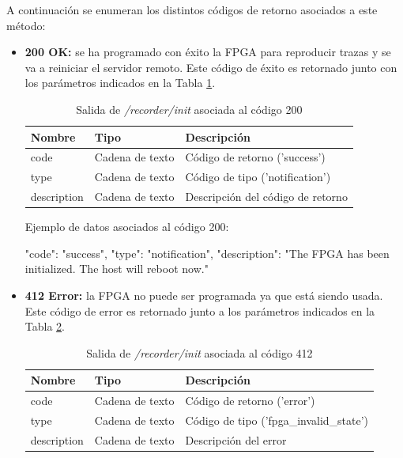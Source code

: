 A continuación se enumeran los distintos códigos de retorno asociados a este método:
\begin{itemize}

\item{\textbf{200 OK:} se ha programado con éxito la \gls{FPGA} para reproducir \glspl{traza} y se va a reiniciar el servidor remoto. Este código de éxito es retornado junto con los parámetros indicados en la Tabla \ref{extra:api:recorderinit:ok}.
\begin{table}[H]
\centering
\begin{tabular}{|l|l|l|}
\hline
\rowcolor[HTML]{F5F5F5}
\textbf{Nombre}  & \textbf{Tipo}   & \textbf{Descripción}              \\ \hline
code             & Cadena de texto & Código de retorno ('success')     \\ \hline
type             & Cadena de texto & Código de tipo ('notification')   \\ \hline
description      & Cadena de texto & Descripción del código de retorno \\ \hline
\end{tabular}
\caption{Salida de \textit{/recorder/init} asociada al código 200}
\label{extra:api:recorderinit:ok}
\end{table}
\begin{minipage}{\textwidth}
Ejemplo de datos asociados al código 200:

\begin{code}[language=json]
{
  "code": "success",
  "type": "notification",
  "description": "The FPGA has been initialized. The host will reboot now."
}
\end{code}
\end{minipage}
}

\item{\textbf{412 Error:} la \gls{FPGA} no puede ser programada ya que está siendo usada. Este código de error es retornado junto a los parámetros indicados en la Tabla \ref{extra:api:recorderinit:error}.
\begin{table}[H]
\centering
\begin{tabular}{|l|l|l|}
\hline
\rowcolor[HTML]{F5F5F5}
\textbf{Nombre}  & \textbf{Tipo}   & \textbf{Descripción}                    \\ \hline
code             & Cadena de texto & Código de retorno ('error')             \\ \hline
type             & Cadena de texto & Código de tipo ('fpga\_invalid\_state') \\ \hline
description      & Cadena de texto & Descripción del error                   \\ \hline
\end{tabular}
\caption{Salida de \textit{/recorder/init} asociada al código 412}
\label{extra:api:recorderinit:error}
\end{table}

}
\end{itemize}
